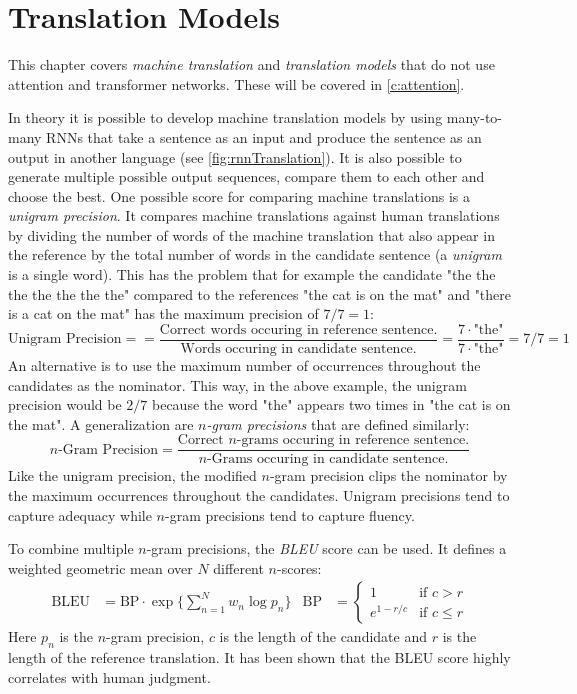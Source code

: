 	\section{Translation Models}
		\label{sec:translation}

		This chapter covers \emph{machine translation} and \emph{translation models} that do not use attention and transformer networks. These will be covered in \autoref{c:attention}.

		In theory it is possible to develop machine translation models by using many-to-many RNNs that take a sentence as an input and produce the sentence as an output in another language (see \autoref{fig:rnnTranslation}). It is also possible to generate multiple possible output sequences, compare them to each other and choose the best. One possible score for comparing machine translations is a \emph{unigram precision}. It compares machine translations against human translations by dividing the number of words of the machine translation that also appear in the reference by the total number of words in the candidate sentence (a \emph{unigram} is a single word). This has the problem that for example the candidate "the the the the the the the" compared to the references "the cat is on the mat" and "there is a cat on the mat" has the maximum precision of \( 7/7 = 1 \):
		\begin{equation}
			\text{Unigram Precision} =
				= \frac{\text{Correct words occuring in reference sentence.}}{\text{Words occuring in candidate sentence.}}
				= \frac{7 \cdot \text{"the"}}{7 \cdot \text{"the"}}
				= 7/7 = 1
		\end{equation}
		An alternative is to use the maximum number of occurrences throughout the candidates as the nominator. This way, in the above example, the unigram precision would be \(2/7\) because the word "the" appears two times in "the cat is on the mat". A generalization are \emph{\(n\)-gram precisions} that are defined similarly:
		\begin{equation}
			\text{\(n\)-Gram Precision}
				= \frac{\text{Correct \(n\)-grams occuring in reference sentence.}}{\text{\(n\)-Grams occuring in candidate sentence.}}
		\end{equation}
		Like the unigram precision, the modified \(n\)-gram precision clips the nominator by the maximum occurrences throughout the candidates. Unigram precisions tend to capture adequacy while \(n\)-gram precisions tend to capture fluency.

		To combine multiple \(n\)-gram precisions, the \emph{BLEU} score can be used. It defines a weighted geometric mean over \(N\) different \(n\)-scores:
		\begin{align}
			\text{BLEU} &= \text{BP} \cdot \exp\bigg\{ \sum_{n = 1}^{N} w_n \log p_n \bigg\} &
			\text{BP} &=
				\begin{cases}
					1 & \text{if } c > r \\
					e^{1 - r/c} & \text{if } c \leq r
				\end{cases}
		\end{align}
		Here \(p_n\) is the \(n\)-gram precision, \(c\) is the length of the candidate and \(r\) is the length of the reference translation. It has been shown that the BLEU score highly correlates with human judgment.

